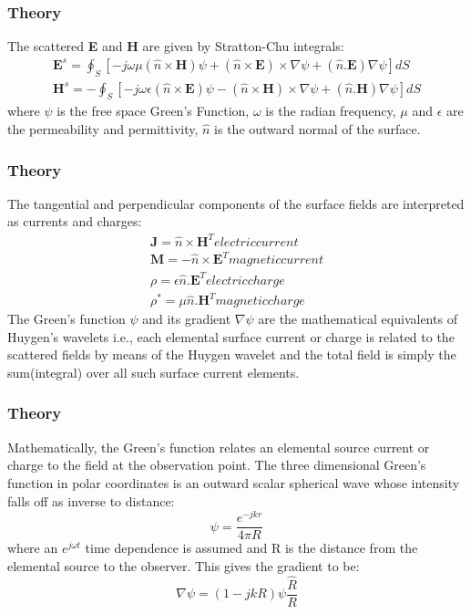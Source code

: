 \documentclass{beamer}
\begin{document}
\begin{frame}
\frametitle{Theory}
The scattered \textbf{E} and \textbf{H} are given by Stratton-Chu integrals:
\begin{eqnarray}
\textbf{E}^s = \oint_S[-j\omega\mu(\hat{n}\times\textbf{H})\psi + (\hat{n}\times\textbf{E})\times\nabla\psi + (\hat{n}.\textbf{E})\nabla\psi]dS \\
\textbf{H}^s = -\oint_S[-j\omega\epsilon(\hat{n}\times\textbf{E})\psi - (\hat{n}\times\textbf{H})\times\nabla\psi + (\hat{n}.\textbf{H})\nabla\psi]dS
\end{eqnarray}
where $\psi$ is the free space Green's Function, $\omega$ is the radian frequency, $\mu$ and $\epsilon$ are the permeability and permittivity, $\hat{n}$ is the outward normal of the surface.
\end{frame}
\begin{frame}
\frametitle{Theory}
The tangential and perpendicular components of the surface fields are interpreted as currents and charges:
\begin{eqnarray}
\textbf{J} = \hat{n}\times\textbf{H}^T electric current \\
\textbf{M} = -\hat{n}\times\textbf{E}^T magnetic current \\
\rho = \epsilon\hat{n}.\textbf{E}^T electric charge \\
\rho^* = \mu\hat{n}.\textbf{H}^T magnetic charge
\end{eqnarray}
The Green's function $\psi$ and its gradient $\nabla\psi$ are the mathematical equivalents of Huygen's wavelets i.e., each elemental surface current or charge is related to the scattered fields by means of the Huygen wavelet and the total field is simply the sum(integral) over all such surface current elements.
\end{frame}
\begin{frame}
\frametitle{Theory}
Mathematically, the Green's function relates an elemental source current or charge to the field at the observation point. The three dimensional Green's function in polar coordinates is an outward scalar spherical wave whose intensity falls off as inverse to distance:
\begin{equation}
\psi = \frac{e^{-jkr}}{4\pi R}
\end{equation}
where an $e^{j\omega t}$ time dependence is assumed and R is the distance from the elemental source to the observer. This gives the gradient to be:
\begin{equation}
\nabla\psi = (1 - jkR)\psi \frac{\hat{R}}{R}
\end{equation}
\end{frame}
\end{document}

